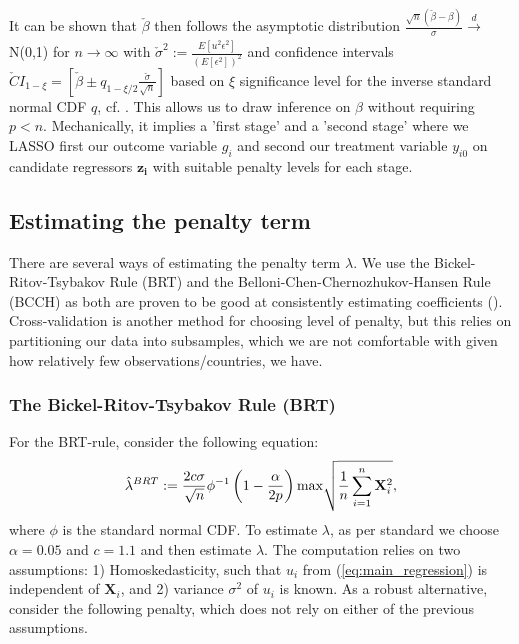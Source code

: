 \documentclass[11pt]{article}
\begin{document}
It can be shown that $\check{\beta}$ then follows the asymptotic distribution $\frac{\sqrt{n}(\check{\beta}-\beta)}{\sigma}\xrightarrow[]{d}$N(0,1) for $n\rightarrow\infty$ with $\check{\sigma}^2:=\frac{E[u^2\epsilon^2]}{(E[\epsilon^2])^2}$ and confidence intervals $\check{C} I_{1-\xi}=\left[\check{\beta} \pm q_{1-\xi / 2} \frac{\check{\sigma}}{\sqrt{n}}\right]$ based on $\xi$ significance level for the inverse standard normal CDF $q$, cf. \cite{belloni2014_restud}. This allows us to draw inference on $\beta$ without requiring $p<n$. Mechanically, it implies a 'first stage' and a 'second stage' where we LASSO first our outcome variable $g_i$ and second our treatment variable $y_{i0}$ on candidate regressors $\mathbf{z_i}$ with suitable penalty levels for each stage.

\subsection{Estimating the penalty term}
There are several ways of estimating the penalty term $\lambda$. We use the Bickel-Ritov-Tsybakov Rule (BRT) and the Belloni-Chen-Chernozhukov-Hansen Rule (BCCH) as both are proven to be good at consistently estimating coefficients (\cite{sørensen_munk_nielsen}). Cross-validation is another method for choosing level of penalty, but this relies on partitioning our data into subsamples, which we are not comfortable with given how relatively few observations/countries, we have.

\subsubsection{The Bickel-Ritov-Tsybakov Rule (BRT)} 
For the BRT-rule, consider the following equation: 
\begin{equation}
    \hat{\lambda}^{BRT}:=\frac{2c\sigma}{\sqrt{n}}\phi^{-1}\left(1-\frac{\alpha}{2p}\right) \text{\text{max}}\sqrt{\frac{1}{n}\sum_{i=1}^{n} \mathbf{X}^{2}_{i}},
\end{equation}
where $\phi$ is the standard normal CDF. To estimate $\lambda$, as per standard we choose $\alpha=0.05$ and $c=1.1$ and then estimate $\lambda$. The computation relies on two assumptions: 1) Homoskedasticity, such that $u_i$ from (\ref{eq:main_regression}) is independent of $\mathbf{X}_{i}$, and 2) variance $\sigma^{2}$ of $u_i$ is known. As a robust alternative, consider the following penalty, which does not rely on either of the previous assumptions.
\end{document}
